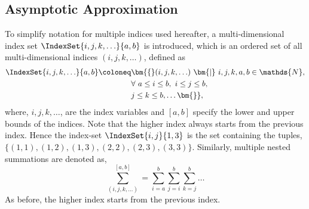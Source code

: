 \subsection{Asymptotic Approximation}
\label{sec:asymptotic_center_manifold}

To simplify notation for multiple indices used hereafter, a multi-dimensional index set $\IndexSet{i,j,k,\ldots}{a,b}$ is introduced, which is an ordered set of all multi-dimensional indices $(i,j,k,\ldots)$, defined as 
\begin{equation}
	\label{eqn:index_set}
	\begin{split}
		\IndexSet{i,j,k,\ldots}{a,b} \coloneq &  \bm{\lbrace} (i,j,k,\ldots)\ \bm{|}\ i,j,k,a,b \in\mathds{N}, \\
					 & \forall\ a\le i \le b,\ i\le j \le b ,		\\
					& j\le k \le b,  \ldots \bm{\rbrace},
	\end{split}
\end{equation}
where, $i,j,k,\ldots$, are the index variables and $[a,b]$ specify the lower and upper bounds of the indices. Note that the higher index always starts from the previous index.
Hence the index-set $\IndexSet{i,j}{1,3}$ is the set containing the tuples, $\{(1,1), (1,2), (1,3), (2,2), (2,3), (3,3)\}$. Similarly, multiple nested summations are denoted as,
\begin{equation}
	\label{eqn:summation}
	\sum_{(i,j,k,\ldots)}^{[a,b]} = \sum_{i=a}^{b}\sum_{j=i}^{b}\sum_{k=j}^{b}\ldots
\end{equation}
As before, the higher index starts from the previous index.

